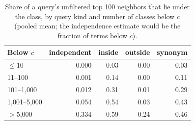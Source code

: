 \begin{table}[t]
\caption{Share of a query's unfiltered top 100 neighbors that lie under the class, by query kind and number of classes below $c$ (pooled mean; the independence estimate would be the fraction of terms below $c$).}
\label{tab-correlation}
\small
\begin{tabular}{@{}lrrrr@{}}
\toprule
Below $c$ & independent & inside & outside & synonym \\
\midrule
$\le$10 & 0.000 & 0.03 & 0.00 & 0.03 \\
11--100 & 0.001 & 0.14 & 0.00 & 0.11 \\
101--1,000 & 0.012 & 0.31 & 0.01 & 0.29 \\
1,001--5,000 & 0.054 & 0.54 & 0.03 & 0.43 \\
$>$5,000 & 0.334 & 0.59 & 0.24 & 0.46 \\
\bottomrule
\end{tabular}
\end{table}
